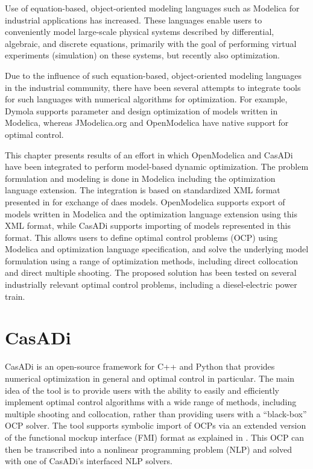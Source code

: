 Use of equation-based, object-oriented modeling languages such as Modelica for
industrial applications has increased. These languages enable users to conveniently model large-scale physical systems described by 
differential, algebraic, and discrete equations, primarily with the goal of performing virtual experiments (simulation) 
on these systems, but recently also optimization.

Due to the influence of such equation-based, object-oriented modeling languages in the industrial community, there have
been several attempts to integrate tools for such languages with numerical algorithms for optimization. For example,
Dymola \cite{dymola} supports parameter and design optimization of models written in Modelica, whereas
JModelica.org \cite{akesson} and OpenModelica \cite{bernhard} have native support for optimal
control.

This chapter presents results of an effort in which OpenModelica and CasADi \cite{casadi} have been integrated to perform model-based dynamic optimization. The problem formulation and modeling is done in Modelica 
including the optimization \cite{optimica} language extension. The integration is based
on standardized XML format presented in \cite{xml} for exchange of \acrshort{daes} models. 
OpenModelica supports export of models written in Modelica and the optimization language extension using this XML 
format, while CasADi supports importing of models represented in this format. This allows users to define optimal control problems (OCP) using
Modelica and optimization language specification, and solve the underlying model formulation using a
range of optimization methods, including direct collocation and direct multiple shooting. The proposed
solution has been tested on several industrially relevant optimal control problems, including a diesel-electric
power train.

\section{CasADi}
\label{sec:optcasadi}

CasADi \cite{casadi} is an open-source framework for C++ and Python that provides numerical optimization in general and optimal control in particular. The main idea of the tool is to provide users with the ability to easily and efficiently implement optimal control algorithms with a wide range of methods, including multiple shooting and collocation, rather than providing users with a “black-box” OCP solver.
The tool supports symbolic import of OCPs via an extended version of the functional mockup interface (FMI) format as explained in \cite{optandersson}. This OCP can then be transcribed into a nonlinear programming problem (NLP) and solved with one of CasADi’s interfaced NLP solvers.

